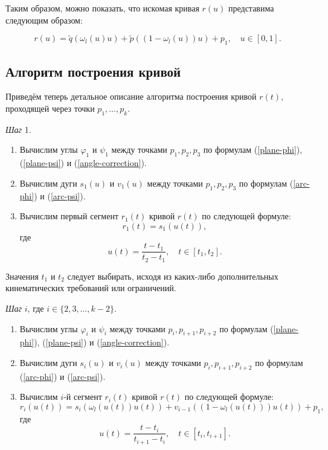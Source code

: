 Таким образом, можно показать, что искомая кривая $r(u)$ представима следующим образом:

\begin{equation}
r(u)=\tilde q(\omega_l(u)u)+\tilde p((1-\omega_l(u))u)+p_1, \quad u \in [0,1].
\label{plane-deformed-curve}
\end{equation}

\subsection*{Алгоритм построения кривой}

Приведём теперь детальное описание алгоритма построения кривой $r(t)$, проходящей через точки $p_1,\dots,p_k$.

\bigskip
\textit{Шаг} 1.

\begin{enumerate}
\item Вычислим углы $\varphi_1$ и $\psi_1$ между точками $p_1,p_2,p_3$ по формулам (\ref{plane-phi}), (\ref{plane-psi}) и
(\ref{angle-correction}).
\item Вычислим дуги $s_1(u)$ и $v_1(u)$ между точками $p_1,p_2,p_3$ по формулам (\ref{arc-phi}) и (\ref{arc-psi}).
\item Вычислим первый сегмент $r_1(t)$ кривой $r(t)$ по следующей формуле:
$$
r_1(t)=s_1(u(t)),
$$
\noindent где
$$
u(t)=\frac{t-t_1}{t_2-t_1}, \quad t \in [t_1,t_2].
$$
\end{enumerate}

Значения $t_1$ и $t_2$ следует выбирать, исходя из каких-либо дополнительных кинематических требований или ограничений.

\bigskip
\textit{Шаг} $i$, где $i \in \{2,3,\dots,k-2\}$.

\begin{enumerate}
\item Вычислим углы $\varphi_i$ и $\psi_i$ между точками $p_i,p_{i+1},p_{i+2}$ по формулам (\ref{plane-phi}),
(\ref{plane-psi}) и (\ref{angle-correction}).
\item Вычислим дуги $s_i(u)$ и $v_i(u)$ между точками $p_i,p_{i+1},p_{i+2}$ по формулам (\ref{arc-phi}) и
(\ref{arc-psi}).
\item Вычислим $i$-й сегмент $r_i(t)$ кривой $r(t)$ по следующей формуле:
$$
r_i(u(t))=s_i(\omega_l(u(t))u(t))+v_{i-1}((1-\omega_l(u(t)))u(t))+p_1,
$$
\noindent где
$$
u(t)=\frac{t-t_i}{t_{i+1}-t_i}, \quad t \in [t_i,t_{i+1}].
$$
\end{enumerate}


